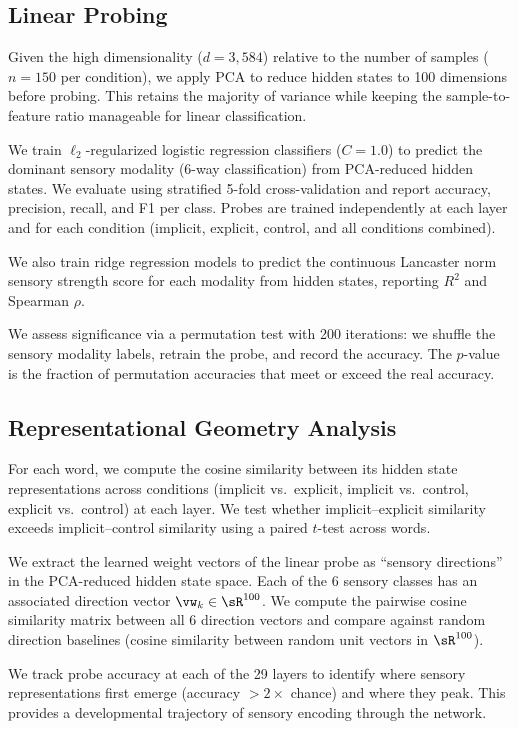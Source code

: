 \subsection{Linear Probing}
\label{sec:probing}

Given the high dimensionality ($d = 3{,}584$) relative to the number of samples ($n = 150$ per condition), we apply PCA to reduce hidden states to 100 dimensions before probing. This retains the majority of variance while keeping the sample-to-feature ratio manageable for linear classification.

We train $\ell_2$-regularized logistic regression classifiers ($C = 1.0$) to predict the dominant sensory modality (6-way classification) from PCA-reduced hidden states. We evaluate using stratified 5-fold cross-validation and report accuracy, precision, recall, and F1 per class. Probes are trained independently at each layer and for each condition (implicit, explicit, control, and all conditions combined).

We also train ridge regression models to predict the continuous Lancaster norm sensory strength score for each modality from hidden states, reporting $R^2$ and Spearman $\rho$.

We assess significance via a permutation test with 200 iterations: we shuffle the sensory modality labels, retrain the probe, and record the accuracy. The $p$-value is the fraction of permutation accuracies that meet or exceed the real accuracy.

\subsection{Representational Geometry Analysis}
\label{sec:geometry}

For each word, we compute the cosine similarity between its hidden state representations across conditions (implicit vs.\ explicit, implicit vs.\ control, explicit vs.\ control) at each layer. We test whether implicit--explicit similarity exceeds implicit--control similarity using a paired $t$-test across words.

We extract the learned weight vectors of the linear probe as ``sensory directions'' in the PCA-reduced hidden state space. Each of the 6 sensory classes has an associated direction vector $\vw_k \in \sR^{100}$. We compute the pairwise cosine similarity matrix between all 6 direction vectors and compare against random direction baselines (cosine similarity between random unit vectors in $\sR^{100}$).

We track probe accuracy at each of the 29 layers to identify where sensory representations first emerge (accuracy $> 2\times$ chance) and where they peak. This provides a developmental trajectory of sensory encoding through the network.
